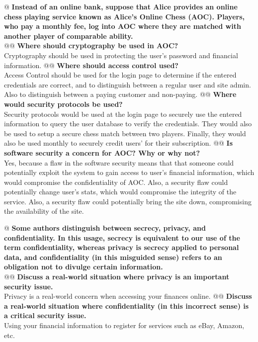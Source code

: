 \documentclass{article}
\begin{document}
\begin{easylist}
 	@ \textbf{Instead of an online bank, suppose that Alice provides an online chess playing service known as Alice's Online Chess (AOC). Players, who pay a monthly fee, log into AOC where they are matched with another player of comparable ability.}\\
 	@@ \textbf{Where should cryptography be used in AOC?}\\
 		Cryptography should be used in protecting the user's password and financial information.
 	@@ \textbf{Where should access control used?}\\
 		Access Control should be used for the login page to determine if the entered credentials are correct, and to distinguish between a regular user and site admin. Also to distinguish between a paying customer and non-paying.
 	@@ \textbf{Where would security protocols be used?}\\
 		Security protocols would be used at the login page to securely use the entered information to query the user database to verify the credentials. They would also be used to setup a secure chess match between two players. Finally, they would also be used monthly to securely credit users' for their subscription.
 	@@ \textbf{Is software security a concern for AOC? Why or why not?}\\
 		Yes, because a flaw in the software security means that that someone could potentially exploit the system to gain access to user's financial information, which would compromise the confidentiality of AOC. Also, a security flaw could potentially change user's stats, which would compromise the integrity of the service. Also, a security flaw could potentially bring the site down, compromising the availability of the site.
 
 	@ \textbf{Some authors distinguish between secrecy, privacy, and confidentiality. In this usage, secrecy is equivalent to our use of the term confidentiality, whereas privacy is secrecy applied to personal data, and confidentiality (in this misguided sense) refers to an obligation not to divulge certain information.}\\
 	@@ \textbf{Discuss a real-world situation where privacy is an important security issue.}\\
 		Privacy is a real-world concern when accessing your finances online.
 	@@ \textbf{Discuss a real-world situation where confidentiality (in this incorrect sense) is a critical security issue.}\\
 		Using your financial information to register for services such as eBay, Amazon, etc.
 	

\end{easylist}
\end{document}
